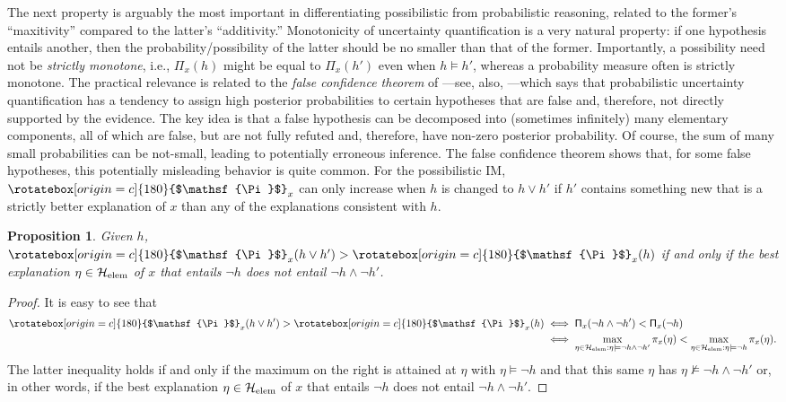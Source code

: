 \documentclass[a4paper, 12pt]{article}
\theoremstyle{plain}
\newtheorem{prop}{Proposition}
\theoremstyle{definition}
\theoremstyle{remark}
\renewcommand{\H}{\mathcal{H}}
\newcommand{\lPi}{\rotatebox[origin=c]{180}{$\mathsf{\Pi}$}} %
\newcommand{\uPi}{\mathsf{\Pi}}%
\begin{document}
The next property is arguably the most important in differentiating possibilistic from probabilistic reasoning, related to the former's ``maxitivity'' compared to the latter's ``additivity.''  Monotonicity of uncertainty quantification is a very natural property: if one hypothesis entails another, then the probability/possibility of the latter should be no smaller than that of the former.  Importantly, a possibility need not be {\em strictly monotone}, i.e., $\uPi_x(h)$ might be equal to $\uPi_x(h')$ even when $h \models h'$, whereas a probability measure often is strictly monotone.  The practical relevance is related to the {\em false confidence theorem} of \citet{balch.martin.ferson.2017}---see, also, \citet{martin.nonadditive, martin.belief2024}---which says that probabilistic uncertainty quantification has a tendency to assign high posterior probabilities to certain hypotheses that are false and, therefore, not directly supported by the evidence.  The key idea is that a false hypothesis can be decomposed into (sometimes infinitely) many elementary components, all of which are false, but are not fully refuted and, therefore, have non-zero posterior probability.  Of course, the sum of many small probabilities can be not-small, leading to potentially erroneous inference.  The false confidence theorem shows that, for some false hypotheses, this potentially misleading behavior is quite common.  For the possibilistic IM, $\lPi_x$ can only increase when $h$ is changed to $h \lor h'$ if $h'$ contains something new that is a strictly better explanation of $x$ than any of the explanations consistent with $h$.  

\begin{prop}
\label{prop:monotone}
Given $h$, $\lPi_x(h \lor h') > \lPi_x(h)$ if and only if the best explanation $\eta \in \H_\text{\rm elem}$ of $x$ that entails $\neg h$ does not entail $\neg h \land \neg h'$.
\end{prop}

\begin{proof}
It is easy to see that 
\begin{align*}
\lPi_x(h \lor h') > \lPi_x(h) & \iff \uPi_x(\neg h \land \neg h') < \uPi_x(\neg h) \\
& \iff \max_{\eta \in \H_\text{elem}: \eta \models \neg h \land \neg h'} \pi_x(\eta) < \max_{\eta \in \H_\text{elem}: \eta \models \neg h} \pi_x(\eta). 
\end{align*}
The latter inequality holds if and only if the maximum on the right is attained at $\eta$ with $\eta \models \neg h$ and that this same $\eta$ has $\eta \not\models \neg h \land \neg h'$ or, in other words, if the best explanation $\eta \in \H_\text{\rm elem}$ of $x$ that entails $\neg h$ does not entail $\neg h \land \neg h'$.
\end{proof}
\end{document}
